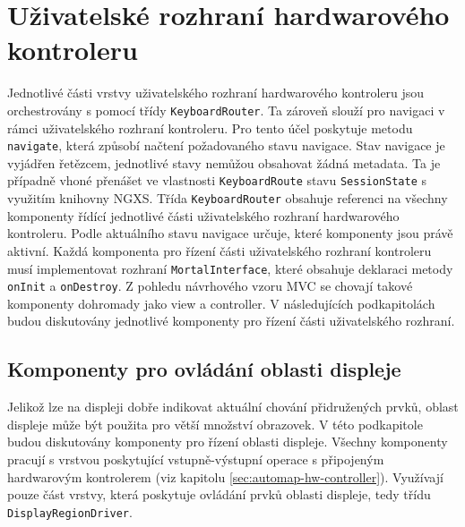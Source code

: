 \documentclass[thesis=M,czech]{FITthesis}[2019/03/06]
\begin{document}
	\section{Uživatelské rozhraní hardwarového kontroleru}
		Jednotlivé části vrstvy uživatelského rozhraní hardwarového kontroleru jsou orchestrovány s pomocí třídy \texttt{KeyboardRouter}.
		Ta zároveň slouží pro navigaci v rámci uživatelského rozhraní kontroleru. Pro tento účel poskytuje metodu \texttt{navigate}, která
		způsobí načtení požadovaného stavu navigace. Stav navigace je vyjádřen řetězcem, jednotlivé stavy nemůžou obsahovat žádná metadata. Ta je případně
		vhoné přenášet ve vlastnosti \texttt{KeyboardRoute} stavu \texttt{SessionState} s využitím knihovny NGXS. Třída \texttt{KeyboardRouter} obsahuje referenci na všechny komponenty řídící jednotlivé 
		části uživatelského rozhraní hardwarového kontroleru. Podle aktuálního stavu navigace určuje, které komponenty jsou právě aktivní. 
		Každá komponenta pro řízení části uživatelského rozhraní kontroleru musí implementovat rozhraní \texttt{MortalInterface}, které obsahuje deklaraci metody \texttt{onInit} a \texttt{onDestroy}.
		Z pohledu návrhového vzoru MVC\cite{reenskaug1979original} se chovají takové komponenty dohromady jako view a controller. V následujících podkapitolách
		budou diskutovány jednotlivé komponenty pro řízení části uživatelského rozhraní.
		
		\subsection{Komponenty pro ovládání oblasti displeje}\label{sec:display-area-components}
			Jelikož lze na displeji dobře indikovat aktuální chování přidružených prvků, oblast displeje může být použita pro větší množství obrazovek.
			V této podkapitole budou diskutovány komponenty pro řízení oblasti displeje. Všechny komponenty pracují s vrstvou poskytující vstupně-výstupní operace s připojeným hardwarovým kontrolerem (viz kapitolu \ref{sec:automap-hw-controller}). Využívají pouze část vrstvy, která poskytuje ovládání prvků oblasti displeje, tedy třídu \texttt{Display\-Region\-Driver}.
					
\end{document}
